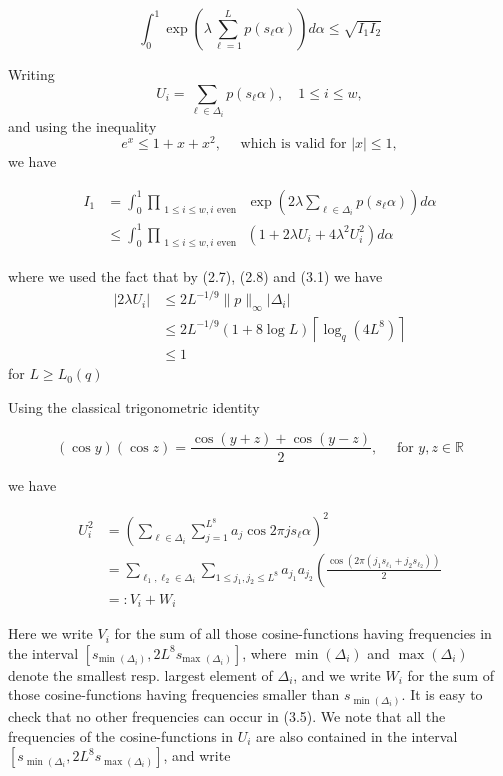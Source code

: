 \documentclass[10pt]{article}
\begin{document}
\begin{equation*}
\int_{0}^{1} \exp \left(\lambda \sum_{\ell=1}^{L} p\left(s_{\ell} \alpha\right)\right) d \alpha \leqslant \sqrt{I_{1} I_{2}} \tag{3.2}
\end{equation*}

Writing
$$
U_{i}=\sum_{\ell \in \Delta_{i}} p\left(s_{\ell} \alpha\right), \quad 1 \leqslant i \leqslant w,
$$
and using the inequality
$$
e^{x} \leqslant 1+x+x^{2}, \quad \text { which is valid for }|x| \leqslant 1,
$$
we have

\begin{align*}
I_{1} & =\int_{0}^{1} \prod_{\substack{1 \leqslant i \leqslant w, i \text { even }}} \exp \left(2 \lambda \sum_{\ell \in \Delta_{i}} p\left(s_{\ell} \alpha\right)\right) d \alpha  \tag{3.3}\\
& \leqslant \int_{0}^{1} \prod_{\substack{1 \leqslant i \leqslant w, i \text { even }}}\left(1+2 \lambda U_{i}+4 \lambda^{2} U_{i}^{2}\right) d \alpha
\end{align*}

where we used the fact that by (2.7), (2.8) and (3.1) we have
$$
\begin{aligned}
\left|2 \lambda U_{i}\right| & \leqslant 2 L^{-1 / 9}\|p\|_{\infty}\left|\Delta_{i}\right| \\
& \leqslant 2 L^{-1 / 9}(1+8 \log L)\left\lceil\log _{q}\left(4 L^{8}\right)\right\rceil \\
& \leqslant 1
\end{aligned}
$$
for $L \geqslant L_{0}(q)$

Using the classical trigonometric identity


\begin{equation*}
(\cos y)(\cos z)=\frac{\cos (y+z)+\cos (y-z)}{2}, \quad \text { for } y, z \in \mathbb{R} \tag{3.4}
\end{equation*}


we have


\begin{align*}
U_{i}^{2} & =\left(\sum_{\ell \in \Delta_{i}} \sum_{j=1}^{L^{8}} a_{j} \cos 2 \pi j s_{\ell} \alpha\right)^{2} \\
& =\sum_{\ell_{1}, \ell_{2} \in \Delta_{i}} \sum_{1 \leqslant j_{1}, j_{2} \leqslant L^{8}} a_{j_{1}} a_{j_{2}}\left(\frac{\cos \left(2 \pi\left(j_{1} s_{\ell_{1}}+j_{2} s_{\ell_{2}}\right)\right)}{2}\right.  \tag{3.5}\\
& =: V_{i}+W_{i}
\end{align*}


Here we write $V_{i}$ for the sum of all those cosine-functions having frequencies in the interval $\left[s_{\text {min }\left(\Delta_{i}\right)}, 2 L^{8} s_{\text {max }\left(\Delta_{i}\right)}\right]$, where $\min \left(\Delta_{i}\right)$ and $\max \left(\Delta_{i}\right)$ denote the smallest resp. largest element of $\Delta_{i}$, and we write $W_{i}$ for the sum of those cosine-functions having frequencies smaller than $s_{\min \left(\Delta_{i}\right)}$. It is easy to check that no other frequencies can occur in (3.5). We note that all the frequencies of the cosine-functions in $U_{i}$ are also contained in the interval $\left[s_{\min \left(\Delta_{i}\right.}, 2 L^{8} s_{\max \left(\Delta_{i}\right)}\right]$, and write
\end{document}
